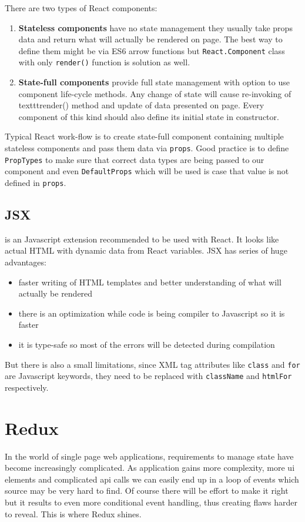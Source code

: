 There are two types of React components:
\begin{enumerate}
\item \textbf{Stateless components} have no state management they usually take props data and return what will actually be rendered on page. The best way to define them might be via ES6 arrow functions but \texttt{React.Component} class with only \texttt{render()} function is solution as well.

\item \textbf{State-full components} provide full state management with option to use component life-cycle methods. Any change of state will cause re-invoking of texttt{render()} method and update of data presented on page. Every component of this kind should also define its initial state in constructor.
\end{enumerate}

Typical React work-flow is to create state-full component containing multiple stateless components and pass them data via \texttt{props}. Good practice is to define \texttt{PropTypes} to make sure that correct data types are being passed to our component and even \texttt{DefaultProps} which will be used is case that value is not defined in \texttt{props}. 

\subsection{JSX} is an Javascript extension recommended to be used with React. It looks like actual HTML with dynamic data from React variables. JSX has series of huge advantages:
\begin{itemize}
\item faster writing of HTML templates and better understanding of what will actually be rendered
\item there is an optimization while code is being compiler to Javascript so it is faster 
\item it is type-safe so most of the errors will be detected during compilation
\end{itemize}  
But there is also a small limitations, since XML tag attributes like \texttt{class} and \texttt{for} are Javascript keywords, they need to be replaced with \texttt{className} and \texttt{htmlFor} respectively. 

\section{Redux}
In the world of single page web applications, requirements to manage state have become increasingly complicated. As application gains more complexity, more ui elements and complicated api calls we can easily end up in a loop of events which source may be very hard to find. Of course there will be effort to make it right but it results to even more conditional event handling, thus creating flaws harder to reveal. This is where Redux shines.

